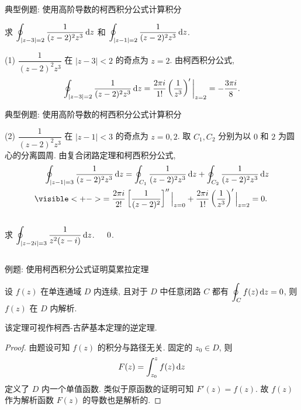 \begin{frame}{典型例题: 使用高阶导数的柯西积分公式计算积分}
\begin{example}
求 $\displaystyle\oint_{|z-3|=2}\frac1{(z-2)^2z^3}\,\mathrm{d} z$ 和 $\displaystyle\oint_{|z-1|=2}\frac1{(z-2)^2z^3}\,\mathrm{d} z$.
\end{example}
\begin{solution}
(1) $\dfrac1{(z-2)^2z^3}$ 在 $|z-3|<2$ 的奇点为 $z=2$.
\onslide<+->
由柯西积分公式,
\[\oint_{|z-3|=2}\frac1{(z-2)^2z^3}\,\mathrm{d} z
	=\frac{2\pi i}{1!}\left(\frac1{z^3}\right)'\bigg|_{z=2}
	=-\frac{3\pi i}8.\]
\end{solution}
\end{frame}


\begin{frame}[<*>]{典型例题: 使用高阶导数的柯西积分公式计算积分}
\onslide<+->
\begin{solutionc}
(2) $\dfrac1{(z-2)^2z^3}$ 在 $|z-1|<3$ 的奇点为 $z=0,2$.
\onslide<+->
取 $C_1,C_2$ 分别为以 $0$ 和 $2$ 为圆心的分离圆周.
\onslide<+->
由复合闭路定理和柯西积分公式,
\onslide<+->
\begin{align*}
&\peq\oint_{|z-1|=3}\frac1{(z-2)^2z^3}\diff z=\oint_{C_1}\frac1{(z-2)^2z^3}\diff z+\oint_{C_2}\frac1{(z-2)^2z^3}\diff z\\
&\visible<+->{=\frac{2\pi i}{2!}\left[\frac1{(z-2)^2}\right]''\Big|_{z=0}+\frac{2\pi i}{1!}\left(\frac1{z^3}\right)'\Big|_{z=2}=0.}
\end{align*}
\end{solutionc}
\onslide<+->
\begin{columns}
		\begin{exercise}
		求 $\displaystyle\oint_{|z-2i|=3}\frac1{z^2(z-i)}\,\mathrm{d} z$.
		\end{exercise}\onslide<+->
		\begin{answer}
		$0\vphantom{\displaystyle\oint_{|z-2i|=3}\frac1{z^2(z-i)}\diff z}$.
		\end{answer}
\end{columns}
\end{frame}


\begin{frame}{例题: 使用柯西积分公式证明莫累拉定理}
\begin{example}[莫累拉定理]
设 $f(z)$ 在单连通域 $D$ 内连续, 且对于 $D$ 中任意闭路 $C$ 都有 $\displaystyle\oint_Cf(z)\,\mathrm{d} z=0$, 则 $f(z)$ 在 $D$ 内解析.
\end{example}
\onslide<+->
该定理可视作柯西-古萨基本定理的逆定理.
\begin{proof}
由题设可知 $f(z)$ 的积分与路径无关.
\onslide<+->
固定的 $z_0\in D$, 则
\[F(z)=\int_{z_0}^zf(z)\,\mathrm{d} z\]
定义了 $D$ 内一个单值函数.
\onslide<+->
类似于原函数的证明可知 $F'(z)=f(z)$.
\onslide<+->
故 $f(z)$ 作为解析函数 $F(z)$ 的导数也是解析的.
\end{proof}
\end{frame}


